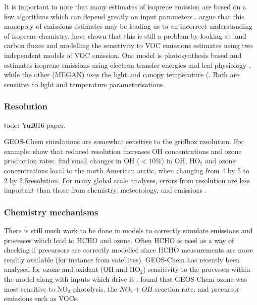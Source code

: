       It is important to note that many estimates of isoprene emission are based on a few algorithms which can depend greatly on input parameters \parencite{Arneth2008,Niinemets2010}.
      \textcite{Arneth2008} argue that this monopoly of emissions estimates may be leading us to an incorrect understanding of isoprene chemistry.
      \textcite{Yue2015} have shown that this is still a problem by looking at land carbon fluxes and modelling the sensitivity to VOC emissions estimates using two independent models of VOC emission.
      One model is photosynthesis based and estimates isoprene emissions using electron transfer energies and leaf physiology \parencite{Niinemets1999}, while the other (MEGAN) uses the light and canopy temperature (\parencite{Guenther1995,Arneth2007}.
      Both are sensitive to light and temperature parameterisations.
      
      
    \subsubsection{Resolution}
      \label{LR:Models:Uncert:Resolution}
      todo: Yu2016 paper.
      
      GEOS-Chem simulations are somewhat sensitive to the gridbox resolution.
      For example: \textcite{Wild2006} show that reduced resolution increases OH concentrations and ozone production rates.
      \textcite{Christian2017} find small changes in OH ($<10$\%) in OH, HO$_2$ and ozone concentrations local to the north American arctic, when changing from 4 by 5 to 2 by 2.5\degr resolution.
      For many global scale analyses, errors from resolution are less important than those from chemistry, meteorology, and emissions \parencite{Christian2017, Christian2018}.
      
            
    
    \subsubsection{Chemistry mechanisms}
      \label{LR:Models:Uncert:Chemistry}
      There is still much work to be done in models to correctly simulate emissions and processes which lead to HCHO and ozone.
      Often HCHO is used as a way of checking if precursors are correctly modelled since HCHO measurements are more readily available (for instance from satellites).
      GEOS-Chem has recently been analysed for ozone and oxidant (OH and HO$_2$) sensitivity to the processes within the model along with inputs which drive it \parencite{Christian2017}.
      \textcite{Christian2017} found that GEOS-Chem ozone was most sensitive to NO$_2$ photolysis, the $NO_2 + OH$ reaction rate, and precursor emissions such as VOCs.

